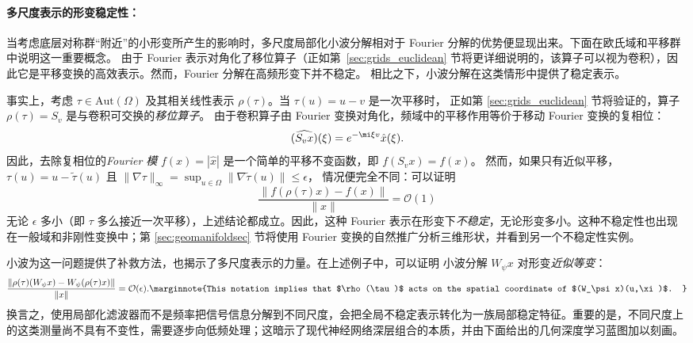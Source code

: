 \paragraph{多尺度表示的形变稳定性：}
当考虑底层对称群“附近”的小形变所产生的影响时，多尺度局部化小波分解相对于 Fourier 分解的优势便显现出来。下面在欧氏域和平移群中说明这一重要概念。
由于 Fourier 表示对角化了移位算子（正如第~\ref{sec:grids_euclidean} 节将更详细说明的，该算子可以视为卷积），因此它是平移变换的高效表示。然而，Fourier 分解在高频形变下并不稳定。
%
相比之下，小波分解在这类情形中提供了稳定表示。

事实上，考虑 $\tau \in \mathrm{Aut}(\Omega)$ 及其相关线性表示 $\rho(\tau)$。当 $\tau(u) = u - v$ 是一次平移时，
正如第 \ref{sec:grids_euclidean} 节将验证的，算子 $\rho(\tau) = S_v$ 是与卷积可交换的{\em 移位算子}。
由于卷积算子由 Fourier 变换对角化，频域中的平移作用等价于移动 Fourier 变换的复相位：
%
$$
(\widehat{S_v x})(\xi) = e^{-\mi \xi v} \hat{x}(\xi). 
$$ 
因此，去除复相位的{\em Fourier 模} $f(x) = |\hat{x}|$ 是一个简单的平移不变函数，即 $f(S_v x) = f(x)$。
%
然而，如果只有近似平移，
$\tau(u) = u - \tilde{\tau}(u)$ 且 $\|\nabla \tau \|_\infty = \sup_{u\in \Omega} \| \nabla \tilde{\tau}(u)\| \leq \epsilon$，
情况便完全不同：可以证明
$$
\frac{\|f(\rho(\tau) x) - f(x) \| }{ \|x\| }= \mathcal{O}(1)
$$ 
无论 $\epsilon$ 多小（即 $\tau$ 多么接近一次平移），上述结论都成立。因此，这种 Fourier 表示在形变下{\em 不稳定}，无论形变多小。这种不稳定性也出现在一般域和非刚性变换中；第 \ref{sec:geomanifoldsec} 节将使用 Fourier 变换的自然推广分析三维形状，并看到另一个不稳定性实例。

小波为这一问题提供了补救方法，也揭示了多尺度表示的力量。在上述例子中，可以证明 \citep{mallat2012group} 小波分解 $W_\psi x$ 对形变{\em 近似等变}：
$$
\frac{\| \rho(\tau) (W_\psi x) - W_\psi (\rho(\tau) x) \|}{\|x\|} = \mathcal{O}(\epsilon).
\marginnote{This notation implies that $\rho(\tau)$ acts on the spatial coordinate of $(W_\psi x)(u,\xi)$.
}
$$
%
换言之，使用局部化滤波器而不是频率把信号信息分解到不同尺度，会把全局不稳定表示转化为一族局部稳定特征。重要的是，不同尺度上的这类测量尚不具有不变性，需要逐步向低频处理；这暗示了现代神经网络深层组合的本质，并由下面给出的几何深度学习蓝图加以刻画。


